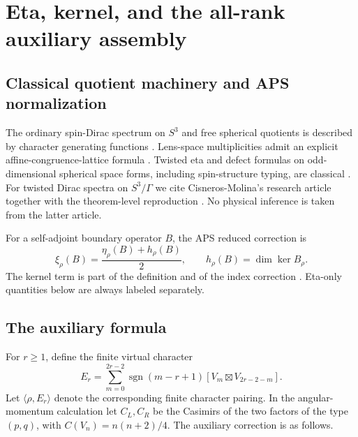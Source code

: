 \documentclass[11pt]{article}
\theoremstyle{definition}
\newcommand{\etaInv}{\eta}
\newcommand{\sgn}{\operatorname{sgn}}
\begin{document}
\section{Eta, kernel, and the all-rank auxiliary assembly}

\subsection{Classical quotient machinery and APS normalization}

The ordinary spin-Dirac spectrum on $S^3$ and free spherical quotients is
described by character generating functions
\cite[pp.~74--76, Thms.~1--2]{Bar1996}.  Lens-space multiplicities admit an
explicit affine-congruence-lattice formula
\cite[arXiv v1, p.~14, Thm.~4.3]{BoldtLauret2017}.  Twisted eta and defect formulas on
odd-dimensional spherical space forms, including spin-structure typing, are
classical
\cite[pp.~427--432]{Gilkey1984}.  For twisted Dirac spectra on $S^3/\Gamma$ we
cite Cisneros-Molina's research article \cite{CisnerosMolina2001} together
with the theorem-level reproduction
\cite[pp.~480--481, Thm.~2.2]{CacicMarcolliTeh2014}.  No physical inference is
taken from the latter article.

For a self-adjoint boundary operator $B$, the APS reduced correction is
\begin{equation}\label{eq:xi-definition}
 \xi_\rho(B)=\frac{\etaInv_\rho(B)+h_\rho(B)}{2},
 \qquad h_\rho(B)=\dim\ker B_\rho.
\end{equation}
The kernel term is part of the definition and of the index correction
\cite[p.~414, Eq.~(3.1) and Thm.~3.3]{APS1975}.  Eta-only quantities below are
always labeled separately.

\subsection{The auxiliary formula}

For $r\geq1$, define the finite virtual character
\[
 E_r=\sum_{m=0}^{2r-2}
 \sgn(m-r+1)
 [V_m\boxtimes V_{2r-2-m}].
\]
Let $\langle\rho,E_r\rangle$ denote the corresponding finite character
pairing.  In the angular-momentum calculation let $C_L,C_R$ be the Casimirs
of the two factors of the type $(p,q)$, with
$C(V_n)=n(n+2)/4$.  The auxiliary correction is as follows.
\end{document}
